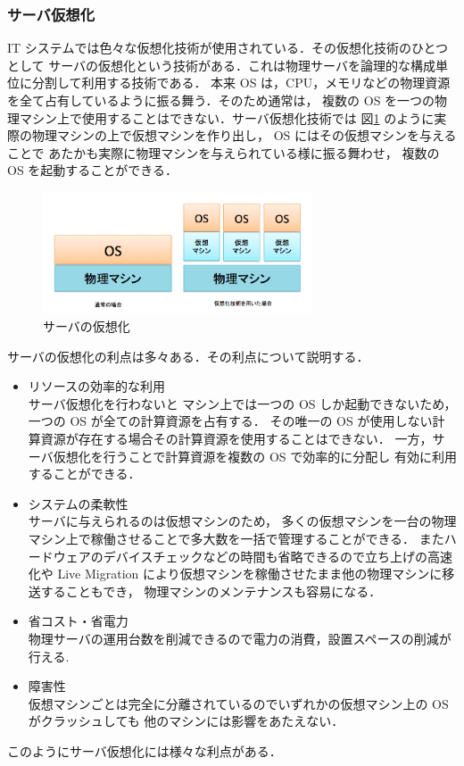 \documentclass[graduation-thesis]{mlarticle}
\begin{document}
\subsubsection{サーバ仮想化}
\label{sec-2-1-2}
IT システムでは色々な仮想化技術が使用されている．その仮想化技術のひとつとして
サーバの仮想化という技術がある．これは物理サーバを論理的な構成単位に分割して利用する技術である．
本来 OS は，CPU，メモリなどの物理資源を全て占有しているように振る舞う．そのため通常は，
複数の OS を一つの物理マシン上で使用することはできない．サーバ仮想化技術では
図\ref{virtual_tech} のように実際の物理マシンの上で仮想マシンを作り出し，
OS にはその仮想マシンを与えることで
あたかも実際に物理マシンを与えられている様に振る舞わせ，
複数の OS を起動することができる．
\begin{figure}[H]\begin{center}\includegraphics[width=8.0cm]{./img/virtual_tech.png}\caption{ サーバの仮想化}\label{virtual_tech}\end{center}\end{figure}

サーバの仮想化の利点は多々ある．その利点について説明する．
\begin{itemize}
\item リソースの効率的な利用\\
     サーバ仮想化を行わないと
マシン上では一つの OS しか起動できないため，一つの OS が全ての計算資源を占有する．
その唯一の OS が使用しない計算資源が存在する場合その計算資源を使用することはできない．
一方，サーバ仮想化を行うことで計算資源を複数の OS で効率的に分配し
有効に利用することができる．
\item システムの柔軟性\\
     サーバに与えられるのは仮想マシンのため，
多くの仮想マシンを一台の物理マシン上で稼働させることで多大数を一括で管理することができる．
またハードウェアのデバイスチェックなどの時間も省略できるので立ち上げの高速化や
Live Migration により仮想マシンを稼働させたまま他の物理マシンに移送することもでき，
物理マシンのメンテナンスも容易になる．
\item 省コスト・省電力\\
     物理サーバの運用台数を削減できるので電力の消費，設置スペースの削減が行える.
\item 障害性\\
     仮想マシンごとは完全に分離されているのでいずれかの仮想マシン上の OS がクラッシュしても
他のマシンには影響をあたえない．
\end{itemize}
このようにサーバ仮想化には様々な利点がある．
\end{document}
